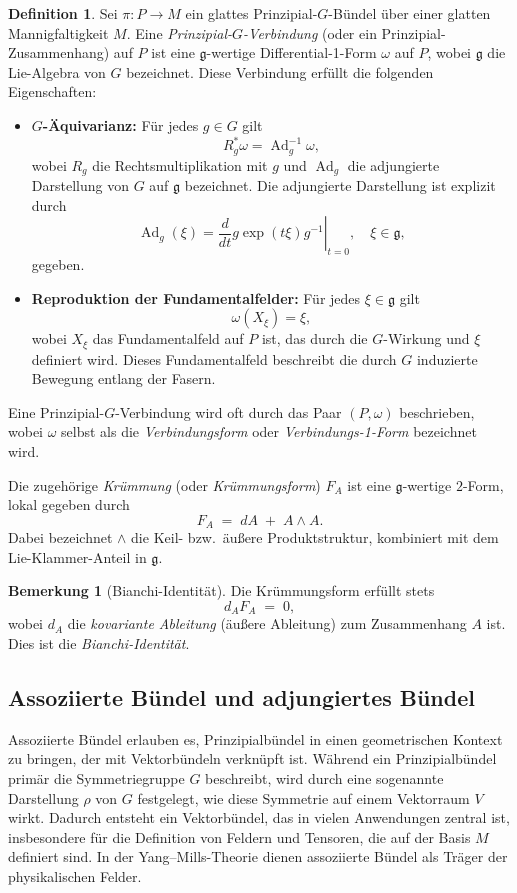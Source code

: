 \documentclass[10pt, letterpaper]{article}
\theoremstyle{custom}
\theoremstyle{definition}
\newtheorem{definition}[theorem]{Definition}
\newtheorem{remark}[theorem]{Bemerkung}
\begin{document}
\begin{definition}
Sei \(\pi: P \to M\) ein glattes Prinzipial-\(G\)-Bündel über einer glatten Mannigfaltigkeit \(M\). Eine \emph{Prinzipial-\(G\)-Verbindung} (oder ein Prinzipial-Zusammenhang) auf \(P\) ist eine \(\mathfrak{g}\)-wertige Differential-1-Form \(\omega\) auf \(P\), wobei \(\mathfrak{g}\) die Lie-Algebra von \(G\) bezeichnet. Diese Verbindung erfüllt die folgenden Eigenschaften:
\begin{itemize}[leftmargin=1.2em]
    \item \textbf{\(G\)-Äquivarianz:} Für jedes \(g \in G\) gilt
    \[
    R_g^* \omega = \operatorname{Ad}_g^{-1} \omega,
    \]
    wobei \(R_g\) die Rechtsmultiplikation mit \(g\) und \(\operatorname{Ad}_g\) die adjungierte Darstellung von \(G\) auf \(\mathfrak{g}\) bezeichnet. Die adjungierte Darstellung ist explizit durch
    \[
    \operatorname{Ad}_g(\xi) = \left.\frac{d}{dt} g \exp(t \xi) g^{-1} \right|_{t=0}, \quad \xi \in \mathfrak{g},
    \]
    gegeben.
    \item \textbf{Reproduktion der Fundamentalfelder:} Für jedes \(\xi \in \mathfrak{g}\) gilt
    \[
    \omega(X_\xi) = \xi,
    \]
    wobei \(X_\xi\) das Fundamentalfeld auf \(P\) ist, das durch die \(G\)-Wirkung und \(\xi\) definiert wird. Dieses Fundamentalfeld beschreibt die durch \(G\) induzierte Bewegung entlang der Fasern.
\end{itemize}
Eine Prinzipial-\(G\)-Verbindung wird oft durch das Paar \((P, \omega)\) beschrieben, wobei \(\omega\) selbst als die \emph{Verbindungsform} oder \emph{Verbindungs-1-Form} bezeichnet wird.
\end{definition}


Die zugehörige \emph{Krümmung} (oder \emph{Krümmungsform}) \(F_A\) ist eine \(\mathfrak{g}\)-wertige \(2\)-Form, lokal gegeben durch
\[
F_A \;=\; dA \;+\; A \wedge A.
\]
Dabei bezeichnet \(\wedge\) die Keil- bzw.\ äußere Produktstruktur, kombiniert mit dem Lie-Klammer-Anteil in \(\mathfrak{g}\).

\begin{remark}[Bianchi-Identität]
Die Krümmungsform erfüllt stets
\[
d_A F_A \;=\; 0,
\]
wobei \(d_A\) die \emph{kovariante Ableitung} (äußere Ableitung) zum Zusammenhang \(A\) ist. Dies ist die \emph{Bianchi-Identität}.
\end{remark}

\subsection{Assoziierte Bündel und adjungiertes Bündel} Assoziierte Bündel erlauben es, Prinzipialbündel in einen geometrischen Kontext zu bringen, der mit Vektorbündeln verknüpft ist. Während ein Prinzipialbündel primär die Symmetriegruppe \(G\) beschreibt, wird durch eine sogenannte Darstellung \(\rho\) von $G$ festgelegt, wie diese Symmetrie auf einem Vektorraum \(V\) wirkt. Dadurch entsteht ein Vektorbündel, das in vielen Anwendungen zentral ist, insbesondere für die Definition von Feldern und Tensoren, die auf der Basis \(M\) definiert sind. In der Yang--Mills-Theorie dienen assoziierte Bündel als Träger der physikalischen Felder.
\end{document}

